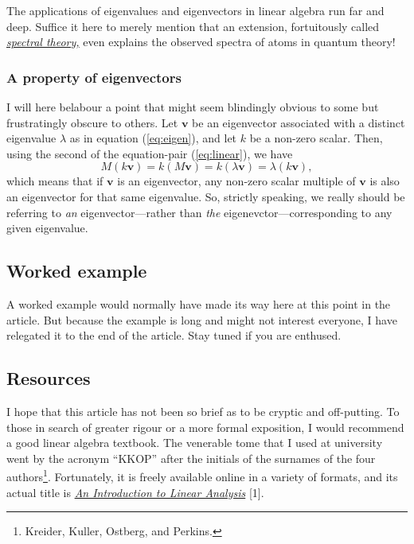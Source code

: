 \documentclass[
  12pt,
  a4paper,
]{article}
\begin{document}
The applications of eigenvalues and eigenvectors in linear algebra run
far and deep. Suffice it here to merely mention that an extension,
fortuitously called
\href{https://en.wikipedia.org/wiki/Spectral_theory}{\emph{spectral
theory,}} even explains the observed spectra of atoms in quantum theory!

\hypertarget{a-property-of-eigenvectors}{%
\subsubsection{A property of
eigenvectors}\label{a-property-of-eigenvectors}}

I will here belabour a point that might seem blindingly obvious to some
but frustratingly obscure to others. Let \(\symbf{v}\) be an eigenvector
associated with a distinct eigenvalue \(\lambda\) as in equation
(\ref{eq:eigen}), and let \(k\) be a non-zero scalar. Then, using the
second of the equation-pair (\ref{eq:linear}), we have \begin{equation}
M(k\symbf{v}) = k(M\symbf{v}) = k(\lambda\symbf{v}) = \lambda(k\symbf{v}),
\label{eq:scaled-eigenvector}\end{equation} which means that if
\(\symbf{v}\) is an eigenvector, any non-zero scalar multiple of
\(\symbf{v}\) is also an eigenvector for that same eigenvalue. So,
strictly speaking, we really should be referring to \emph{an}
eigenvector---rather than \emph{the} eigenevctor---corresponding to any
given eigenvalue.

\hypertarget{worked-example}{%
\subsection{Worked example}\label{worked-example}}

A worked example would normally have made its way here at this point in
the article. But because the example is long and might not interest
everyone, I have relegated it to the end of the article. Stay tuned if
you are enthused.

\hypertarget{resources}{%
\subsection{Resources}\label{resources}}

I hope that this article has not been so brief as to be cryptic and
off-putting. To those in search of greater rigour or a more formal
exposition, I would recommend a good linear algebra textbook. The
venerable tome that I used at university went by the acronym ``KKOP''
after the initials of the surnames of the four authors\footnote{Kreider,
  Kuller, Ostberg, and Perkins.}. Fortunately, it is freely available
online in a variety of formats, and its actual title is
\href{https://archive.org/details/AnIntroductionToLinearAnalysis}{\emph{An
Introduction to Linear Analysis}} {[}1{]}.
\end{document}
